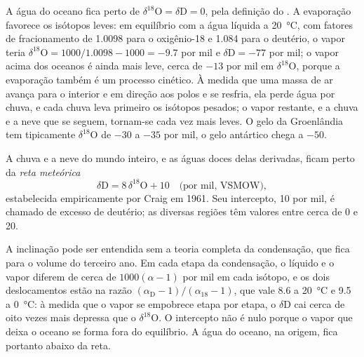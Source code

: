 A água do oceano fica perto de $\delta^{18}\mathrm{O} = \delta\mathrm{D} = 0$, pela
definição do . A evaporação favorece os isótopos leves: em equilíbrio
com a água líquida a \qty{20}{\degreeCelsius}, com fatores de fracionamento de
1.0098 para o oxigênio-18 e 1.084 para o deutério, o vapor teria
$\delta^{18}\mathrm{O} = 1000/1.0098 - 1000 = -9.7$ por mil e $\delta\mathrm{D} =
-77$ por mil; o vapor acima dos oceanos é ainda mais leve, cerca de $-13$ por mil
em $\delta^{18}\mathrm{O}$, porque a evaporação também é um processo cinético.
À medida que uma massa de ar avança para o interior e em direção aos polos e se resfria, ela perde água por chuva, e
cada chuva leva primeiro os isótopos pesados; o vapor restante, e a chuva e a
neve que se seguem, tornam-se cada vez mais leves. O gelo da Groenlândia tem tipicamente
$\delta^{18}\mathrm{O}$ de $-30$ a $-35$ por mil, o gelo antártico chega a $-50$.

\begin{proposition}\label{prop:b2:isotope-geochemistry:mwl}
A chuva e a neve do mundo inteiro, e as águas doces delas derivadas,
ficam perto da \emph{reta meteórica}
\[
  \delta\mathrm{D} = 8\,\delta^{18}\mathrm{O} + 10 \quad\text{(por mil, VSMOW)},
\]
estabelecida empiricamente por Craig em 1961. Seu intercepto, 10 por mil, é chamado
de excesso de deutério; as diversas regiões têm valores entre cerca de 0 e 20.
\end{proposition}
\admitted

\noindent A inclinação pode ser entendida sem a teoria completa da condensação,
que fica para o volume do terceiro ano. Em cada etapa da condensação, o líquido
e o vapor diferem de cerca de $1000(\alpha - 1)$ por mil em cada isótopo, e
os dois deslocamentos estão na razão $(\alpha_{\mathrm D}-1)/(\alpha_{18}-1)$, que
vale 8.6 a \qty{20}{\degreeCelsius} e 9.5 a \qty{0}{\degreeCelsius}: à medida que o
vapor se empobrece etapa por etapa, o $\delta\mathrm{D}$ cai cerca de oito vezes mais depressa
que o $\delta^{18}\mathrm{O}$. O intercepto não é nulo porque o vapor que deixa
o oceano se forma fora do equilíbrio. A água do oceano, na origem, fica portanto
abaixo da reta.

